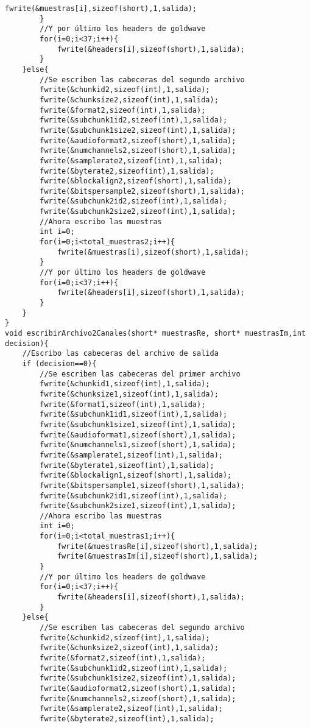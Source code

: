 \begin{lstlisting}[style=CStyle]
			fwrite(&muestras[i],sizeof(short),1,salida);
		}
		//Y por último los headers de goldwave
		for(i=0;i<37;i++){
			fwrite(&headers[i],sizeof(short),1,salida);
		}
	}else{
		//Se escriben las cabeceras del segundo archivo
		fwrite(&chunkid2,sizeof(int),1,salida);
		fwrite(&chunksize2,sizeof(int),1,salida);
		fwrite(&format2,sizeof(int),1,salida);
		fwrite(&subchunk1id2,sizeof(int),1,salida);
		fwrite(&subchunk1size2,sizeof(int),1,salida);
		fwrite(&audioformat2,sizeof(short),1,salida);
		fwrite(&numchannels2,sizeof(short),1,salida);
		fwrite(&samplerate2,sizeof(int),1,salida);
		fwrite(&byterate2,sizeof(int),1,salida);
		fwrite(&blockalign2,sizeof(short),1,salida);
		fwrite(&bitspersample2,sizeof(short),1,salida);
		fwrite(&subchunk2id2,sizeof(int),1,salida);
		fwrite(&subchunk2size2,sizeof(int),1,salida);
		//Ahora escribo las muestras
		int i=0;
		for(i=0;i<total_muestras2;i++){
			fwrite(&muestras[i],sizeof(short),1,salida);
		}
		//Y por último los headers de goldwave
		for(i=0;i<37;i++){
			fwrite(&headers[i],sizeof(short),1,salida);
		}
	}    
}
void escribirArchivo2Canales(short* muestrasRe, short* muestrasIm,int decision){
	//Escribo las cabeceras del archivo de salida
	if (decision==0){
		//Se escriben las cabeceras del primer archivo
		fwrite(&chunkid1,sizeof(int),1,salida);
		fwrite(&chunksize1,sizeof(int),1,salida);
		fwrite(&format1,sizeof(int),1,salida);
		fwrite(&subchunk1id1,sizeof(int),1,salida);
		fwrite(&subchunk1size1,sizeof(int),1,salida);
		fwrite(&audioformat1,sizeof(short),1,salida);
		fwrite(&numchannels1,sizeof(short),1,salida);
		fwrite(&samplerate1,sizeof(int),1,salida);
		fwrite(&byterate1,sizeof(int),1,salida);
		fwrite(&blockalign1,sizeof(short),1,salida);
		fwrite(&bitspersample1,sizeof(short),1,salida);
		fwrite(&subchunk2id1,sizeof(int),1,salida);
		fwrite(&subchunk2size1,sizeof(int),1,salida);
		//Ahora escribo las muestras
		int i=0;
		for(i=0;i<total_muestras1;i++){
			fwrite(&muestrasRe[i],sizeof(short),1,salida);
			fwrite(&muestrasIm[i],sizeof(short),1,salida);
		}
		//Y por último los headers de goldwave
		for(i=0;i<37;i++){
			fwrite(&headers[i],sizeof(short),1,salida);
		}
	}else{
		//Se escriben las cabeceras del segundo archivo
		fwrite(&chunkid2,sizeof(int),1,salida);
		fwrite(&chunksize2,sizeof(int),1,salida);
		fwrite(&format2,sizeof(int),1,salida);
		fwrite(&subchunk1id2,sizeof(int),1,salida);
		fwrite(&subchunk1size2,sizeof(int),1,salida);
		fwrite(&audioformat2,sizeof(short),1,salida);
		fwrite(&numchannels2,sizeof(short),1,salida);
		fwrite(&samplerate2,sizeof(int),1,salida);
		fwrite(&byterate2,sizeof(int),1,salida);

\end{lstlisting}
